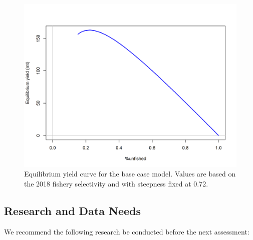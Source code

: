 \documentclass[12pt,]{article}
\begin{document}
\begin{figure}
\centering
\includegraphics{r4ss/plots_mod1/yield1_yield_curve.png}
\caption{Equilibrium yield curve for the base case model. Values are
based on the 2018 fishery selectivity and with steepness fixed at 0.72.
\label{fig:Yield_all}}
\end{figure}

\FloatBarrier

\newpage

\subsection*{Research and Data Needs}\label{research-and-data-needs}

We recommend the following research be conducted before the next
assessment:
\end{document}
